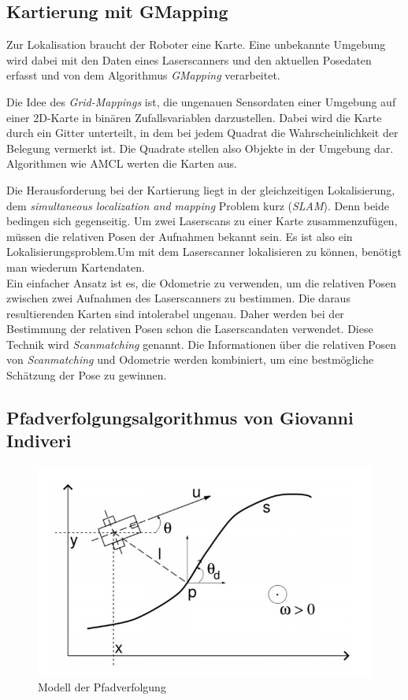 \documentclass[11pt,a4paper]{article}
\begin{document}
\subsection{Kartierung mit GMapping  \cite{Gmapping}} \label{ssection:gmapping}
{
	Zur Lokalisation braucht der Roboter eine Karte. Eine unbekannte Umgebung wird dabei mit den Daten eines Laserscanners und den aktuellen Posedaten erfasst und von dem Algorithmus \textit{GMapping} verarbeitet.
	
	Die Idee des  \textit{Grid-Mappings} ist, die ungenauen Sensordaten einer Umgebung auf einer 2D-Karte in bin\"aren Zufallsvariablen darzustellen. Dabei wird die Karte durch ein Gitter unterteilt, in dem bei jedem Quadrat die Wahrscheinlichkeit der Belegung vermerkt ist. Die Quadrate stellen also Objekte in der Umgebung dar. Algorithmen wie AMCL werten die Karten aus.  
	
	Die Herausforderung bei der Kartierung liegt in der gleichzeitigen Lokalisierung, dem \textit{simultaneous localization and mapping} Problem kurz (\textit{SLAM}). Denn beide bedingen sich gegenseitig. Um  zwei Laserscans zu einer Karte zusammenzuf\"ugen, m\"ussen die relativen Posen der Aufnahmen bekannt sein. Es ist also ein Lokalisierungsproblem.Um mit dem Laserscanner lokalisieren zu k\"onnen, ben\"otigt man wiederum Kartendaten. \\
    
    Ein einfacher Ansatz ist es, die Odometrie zu verwenden, um die relativen Posen zwischen zwei Aufnahmen des Laserscanners zu bestimmen. Die daraus resultierenden Karten sind intolerabel ungenau. Daher werden bei der Bestimmung der relativen Posen schon die Laserscandaten verwendet. Diese Technik wird \textit{Scanmatching} genannt. Die Informationen \"uber die relativen Posen von \textit{Scanmatching} und Odometrie werden kombiniert, um eine bestm\"ogliche Sch\"atzung der Pose zu gewinnen.

\subsection{Pfadverfolgungsalgorithmus von Giovanni Indiveri}


\begin{figure}[h]
	\includegraphics[width=\linewidth]{pictures/Pfadverfolgung.JPG}
	\caption{Modell der Pfadverfolgung \label{fig:path}}
\end{figure}

}
\end{document}
